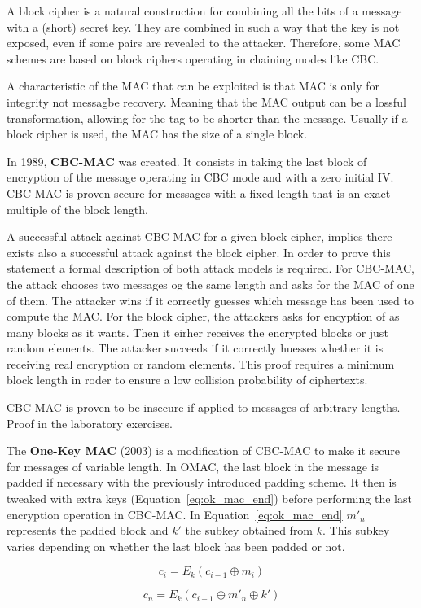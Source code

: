 A block cipher is a natural construction for combining all the bits of a message with a (short) secret key.
They are combined in such a way that the key is not exposed, even if some pairs are revealed to the attacker.
Therefore, some MAC schemes are based on block ciphers operating in chaining modes like CBC.

A characteristic of the MAC that can be exploited is that MAC is only for integrity not messagbe recovery.
Meaning that the MAC output can be a lossful transformation, allowing for the tag to be shorter than the message.
Usually if a block cipher is used, the MAC has the size of a single block.

In 1989, \textbf{CBC-MAC} was created.
It consists in taking the last block of encryption of the message operating in CBC mode and with a zero initial IV.
CBC-MAC is proven secure for messages with a fixed length that is an exact multiple of the block length.

A successful attack against CBC-MAC for a given block cipher, implies there exists also a successful attack against the block cipher.
In order to prove this statement a formal description of both attack models is required.
For CBC-MAC, the attack chooses two messages og the same length and asks for the MAC of one of them.
The attacker wins if it correctly guesses which message has been used to compute the MAC.
For the block cipher, the attackers asks for encyption of as many blocks as it wants.
Then it eirher receives the encrypted blocks or just random elements.
The attacker succeeds if it correctly huesses whether it is receiving real encryption or random elements.
This proof requires a minimum block length in roder to ensure a low collision probability of ciphertexts.

CBC-MAC is proven to be insecure if applied to messages of arbitrary lengths.
Proof in the laboratory exercises.

The \textbf{One-Key MAC} (2003) is a modification of CBC-MAC to make it secure for messages of variable length.
In OMAC, the last block in the message is padded if necessary with the previously introduced padding scheme.
It then is tweaked with extra keys (Equation~\ref{eq:ok_mac_end}) before performing the last encryption operation in CBC-MAC.
In Equation~\ref{eq:ok_mac_end} $m'_n$ represents the padded block and $k'$ the subkey obtained from $k$.
This subkey varies depending on whether the last block has been padded or not.

\begin{equation}
  c_i = E_k(c_{i-1} \oplus m_i)
  \label{eq:ok_mac_base}
\end{equation}

\begin{equation}
  c_n = E_k(c_{i-1} \oplus m'_n \oplus k')
  \label{eq:ok_mac_end}
\end{equation}
